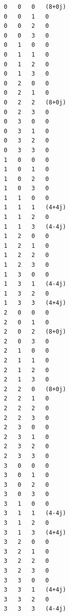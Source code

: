 \documentclass{homework}
\begin{document}
	\begin{lstlisting}[title={Python code output.}]
0	0	0	(8+0j)
0	0	1	0
0	0	2	0
0	0	3	0
0	1	0	0
0	1	1	0
0	1	2	0
0	1	3	0
0	2	0	0
0	2	1	0
0	2	2	(8+0j)
0	2	3	0
0	3	0	0
0	3	1	0
0	3	2	0
0	3	3	0
1	0	0	0
1	0	1	0
1	0	2	0
1	0	3	0
1	1	0	0
1	1	1	(4+4j)
1	1	2	0
1	1	3	(4-4j)
1	2	0	0
1	2	1	0
1	2	2	0
1	2	3	0
1	3	0	0
1	3	1	(4-4j)
1	3	2	0
1	3	3	(4+4j)
2	0	0	0
2	0	1	0
2	0	2	(8+0j)
2	0	3	0
2	1	0	0
2	1	1	0
2	1	2	0
2	1	3	0
2	2	0	(8+0j)
2	2	1	0
2	2	2	0
2	2	3	0
2	3	0	0
2	3	1	0
2	3	2	0
2	3	3	0
3	0	0	0
3	0	1	0
3	0	2	0
3	0	3	0
3	1	0	0
3	1	1	(4-4j)
3	1	2	0
3	1	3	(4+4j)
3	2	0	0
3	2	1	0
3	2	2	0
3	2	3	0
3	3	0	0
3	3	1	(4+4j)
3	3	2	0
3	3	3	(4-4j)
\end{lstlisting}
\end{document}
